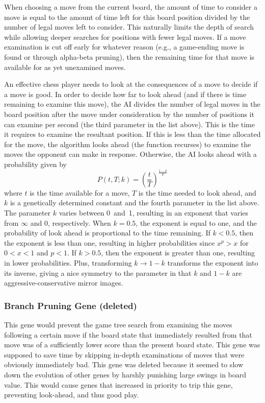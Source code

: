 \documentclass[letterpaper]{article}
\renewcommand\_{\textunderscore\allowbreak}
\begin{document}
When choosing a move from the current board, the amount of time to consider a move is equal to the amount of time left for this board position divided by the number of legal moves left to consider. This naturally limits the depth of search while allowing deeper searches for positions with fewer legal moves. If a move examination is cut off early for whatever reason (e.g., a game-ending move is found or through alpha-beta pruning), then the remaining time for that move is available for as yet unexamined moves.

An effective chess player needs to look at the consequences of a move to decide if a move is good. In order to decide how far to look ahead (and if there is time remaining to examine this move), the AI divides the number of legal moves in the board position after the move under consideration by the number of positions it can examine per second (the third parameter in the list above). This is the time it requires to examine the resultant position. If this is less than the time allocated for the move, the algorithm looks ahead (the function recurses) to examine the moves the opponent can make in response. Otherwise, the AI looks ahead with a probability given by
\[P(t, T; k) = \left(\frac{t}{T}\right)^\frac{1-k}{k}\]
where \(t\) is the time available for a move, \(T\) is the time needed to look ahead, and \(k\) is a genetically determined constant and the fourth parameter in the list above. The parameter \(k\) varies between 0~and~1, resulting in an exponent that varies from \(\infty\) and \(0\), respectively. When \(k=0.5\), the exponent is equal to one, and the probability of look ahead is proportional to the time remaining. If \(k < 0.5\), then the exponent is less than one, resulting in higher probabilities since \(x^p > x\) for \(0 < x < 1\) and \(p < 1\).  If \(k > 0.5\), then the exponent is greater than one, resulting in lower probabilities. Plus, transforming \(k \to 1-k\) transforms the exponent into its inverse, giving a nice symmetry to the parameter in that \(k\) and \(1-k\) are aggressive-conservative mirror images.

\subsubsection{Branch Pruning Gene (deleted)}

This gene would prevent the game tree search from examining the moves following a certain move if the board state that immediately resulted from that move was of a sufficiently lower score than the present board state. This gene was supposed to save time by skipping in-depth examinations of moves that were obviously immediately bad. This gene was deleted because it seemed to slow down the evolution of other genes by harshly punishing large swings in board value. This would cause genes that increased in priority to trip this gene, preventing look-ahead, and thus good play.
\end{document}
